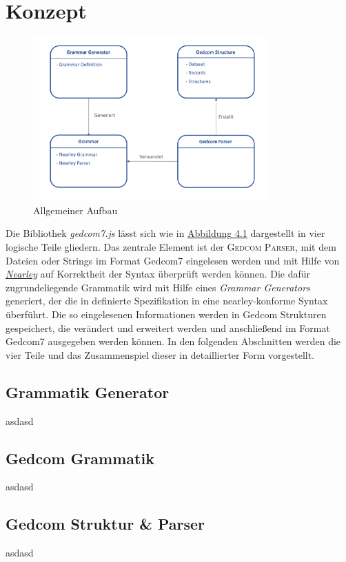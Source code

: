 \chapter{Konzept}

\begin{figure}[b]
	\centering
	\includegraphics[width=0.8\textwidth]{images/konzept_allgemein.png}
	\caption{Allgemeiner Aufbau}
	\label{fig: Allgemeiner Aufbau}
\end{figure}

\label{chap: Konzept}
Die Bibliothek \textit{gedcom7.js} lässt sich wie in \hyperref[fig: Allgemeiner Aufbau]{Abbildung 4.1} dargestellt in vier logische Teile gliedern. Das zentrale Element ist der \textsc{Gedcom Parser}, mit dem Dateien oder Strings im Format Gedcom7 eingelesen werden und mit Hilfe von \hyperref[sec: Nearley]{\textit{Nearley}} auf Korrektheit der Syntax überprüft werden können. Die dafür zugrundeliegende Grammatik wird mit Hilfe eines \textit{Grammar Generators} generiert, der die in \cite{GEDCOM} definierte Spezifikation in eine nearley-konforme Syntax überführt. Die so eingelesenen Informationen werden in Gedcom Strukturen gespeichert, die verändert und erweitert werden und anschließend im Format Gedcom7 ausgegeben werden können. In den folgenden Abschnitten werden die vier Teile und das Zusammenspiel dieser in detaillierter Form vorgestellt.

\section{Grammatik Generator}
\label{Grammatik Generator}
asdasd

\section{Gedcom Grammatik}
\label{Gedcom Grammatik}
asdasd

\section{Gedcom Struktur \& Parser}
\label{Gedcom Struktur und Parser}
asdasd


